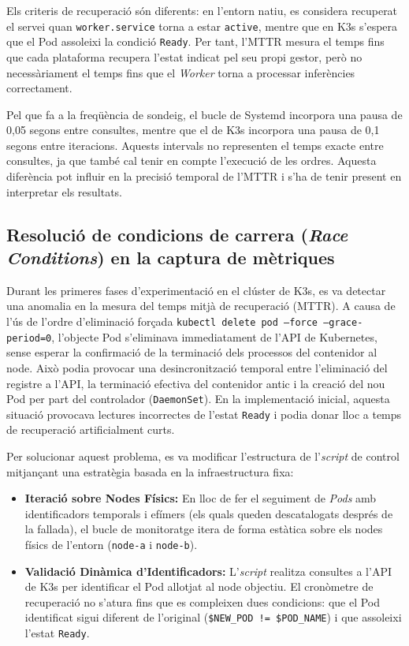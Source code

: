 Els criteris de recuperació són diferents: en l'entorn natiu, es considera recuperat el servei quan \texttt{worker.service} torna a estar \texttt{active}, mentre que en K3s s'espera que el Pod assoleixi la condició \texttt{Ready}. 
Per tant, l'MTTR mesura el temps fins que cada plataforma recupera l'estat indicat pel seu propi gestor, però no necessàriament el temps fins que el  \textit{Worker} torna a processar inferències correctament.

Pel que fa a la freqüència de sondeig, el bucle de Systemd incorpora una pausa de 0,05 segons entre consultes, mentre que el de K3s incorpora una pausa de 0,1 segons entre iteracions. 
Aquests intervals no representen el temps exacte entre consultes, ja que també cal tenir en compte l'execució de les ordres. Aquesta diferència pot influir en la precisió temporal de l'MTTR i s'ha de tenir present en interpretar els resultats.

\subsection{Resolució de condicions de carrera (\textit{Race Conditions}) en la captura de mètriques}
Durant les primeres fases d'experimentació en el clúster de K3s, es va detectar una anomalia en la mesura del temps mitjà de recuperació (MTTR). 
A causa de l'ús de l'ordre d'eliminació forçada \texttt{kubectl delete pod --force --grace-period=0}, l'objecte Pod s'eliminava immediatament de l'API de Kubernetes, sense esperar la confirmació de la terminació dels processos del contenidor al node. 
Això podia provocar una desincronització temporal entre l'eliminació del registre a l'API, la terminació efectiva del contenidor antic i la creació del nou Pod per part del controlador (\texttt{DaemonSet}). 
En la implementació inicial, aquesta situació provocava lectures incorrectes de l'estat \texttt{Ready} i podia donar lloc a temps de recuperació artificialment curts.

Per solucionar aquest problema, es va modificar l'estructura de l'\textit{script} de control mitjançant una estratègia basada en la infraestructura fixa:

\begin{itemize}
    \item \textbf{Iteració sobre Nodes Físics:} En lloc de fer el seguiment de \textit{Pods} amb identificadors temporals i efímers (els quals queden descatalogats després de la fallada), el bucle de monitoratge itera de forma estàtica sobre els nodes físics de l'entorn (\texttt{node-a} i \texttt{node-b}).
    \item \textbf{Validació Dinàmica d'Identificadors:} L'\textit{script} realitza consultes a l'API de K3s per identificar el Pod allotjat al node objectiu. El cronòmetre de recuperació no s'atura fins que es compleixen dues condicions: que el Pod identificat sigui diferent de l'original (\texttt{\$NEW\_POD != \$POD\_NAME}) i que assoleixi l'estat \texttt{Ready}.
\end{itemize}

